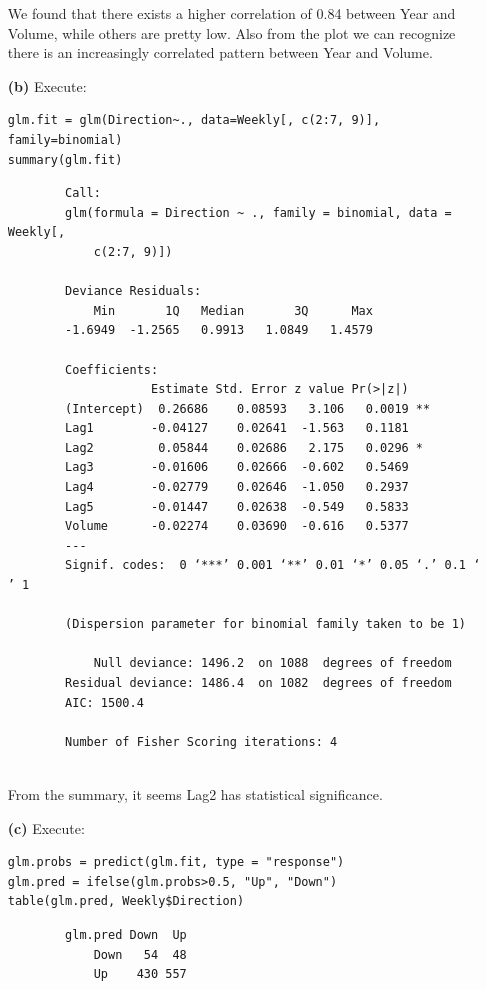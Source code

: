 \documentclass[twoside,11pt]{homework}
\begin{document}
\begin{enumerate}
		We found that there exists a higher correlation of 0.84 between Year and Volume, while others are pretty low. Also from the plot we can recognize there is an increasingly correlated pattern between Year and Volume.
		
		
		\item[\textbf{(b)}] Execute:
		
		\begin{lstlisting}
glm.fit = glm(Direction~., data=Weekly[, c(2:7, 9)], family=binomial)
summary(glm.fit)
		\end{lstlisting}
		
		\begin{verbatim}
		Call:
		glm(formula = Direction ~ ., family = binomial, data = Weekly[, 
		    c(2:7, 9)])
		
		Deviance Residuals: 
		    Min       1Q   Median       3Q      Max  
		-1.6949  -1.2565   0.9913   1.0849   1.4579  
		
		Coefficients:
		            Estimate Std. Error z value Pr(>|z|)   
		(Intercept)  0.26686    0.08593   3.106   0.0019 **
		Lag1        -0.04127    0.02641  -1.563   0.1181   
		Lag2         0.05844    0.02686   2.175   0.0296 * 
		Lag3        -0.01606    0.02666  -0.602   0.5469   
		Lag4        -0.02779    0.02646  -1.050   0.2937   
		Lag5        -0.01447    0.02638  -0.549   0.5833   
		Volume      -0.02274    0.03690  -0.616   0.5377   
		---
		Signif. codes:  0 ‘***’ 0.001 ‘**’ 0.01 ‘*’ 0.05 ‘.’ 0.1 ‘ ’ 1
		
		(Dispersion parameter for binomial family taken to be 1)
		
		    Null deviance: 1496.2  on 1088  degrees of freedom
		Residual deviance: 1486.4  on 1082  degrees of freedom
		AIC: 1500.4
		
		Number of Fisher Scoring iterations: 4
		
		\end{verbatim}
		
		From the summary, it seems Lag2 has statistical significance.
		
		\item[\textbf{(c)}] Execute:
		
		\begin{lstlisting}
glm.probs = predict(glm.fit, type = "response")
glm.pred = ifelse(glm.probs>0.5, "Up", "Down")
table(glm.pred, Weekly$Direction)
		\end{lstlisting}
		
		\begin{verbatim}
		glm.pred Down  Up
		    Down   54  48
		    Up    430 557
		    

\end{verbatim}
\end{enumerate}
\end{document}
